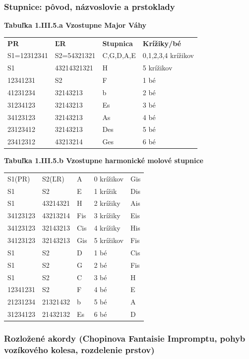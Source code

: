 \subsubsection{Stupnice: pôvod, názvoslovie a prstoklady}

\textbf{Tabuľka 1.III.5.a Vzostupne Major Váhy}\\
\noindent\begin{tabular}{L{1in}L{1in}L{1in}L{1in}}
\textbf{PR} & \textbf{ĽR} & \textbf{Stupnica} & \textbf{Krížiky/bé}\\
S1=12312341 & S2=54321321 & C,G,D,A,E & 0,1,2,3,4 krížikov\\
S1 & 43214321321 & H & 5 krížikov\\
12341231 & S2 & F & 1 bé\\
41231234 & 32143213 & b & 2 bé\\
31234123 & 32143213 & Es & 3 bé\\
34123123 & 32143213 & As & 4 bé\\
23123412 & 32143213 & Des & 5 bé\\
23412312 & 43213214 & Ges & 6 bé
\end{tabular}
\bigskip

\textbf{Tabuľka 1.III.5.b Vzostupne harmonické molové stupnice}\\
\begin{tabular}{L{1in}L{1in}L{1in}L{1in}L{1in}}
S1(PR) & S2(ĽR) & A & 0 krížikov & Gis\\
S1 & S2 & E & 1 krížik & Dis\\
S1 & 43214321 & H & 2 krížiky & Ais\\
34123123 & 43213214 & Fis & 3 krížiky & Eis\\
34123123 & 32143213 & Cis & 4 krížiky & His\\
34123123 & 32143213 & Gis & 5 krížikov & Fis\\
S1 & S2 & D & 1 bé & Cis\\
S1 & S2 & G & 2 bé & Fis\\
S1 & S2 & C & 3 bé & H\\
12341231 & S2 & F & 4 bé & E\\
21231234 & 21321432 & b & 5 bé & A\\
31234123 & 21432132 & Es & 6 bé & D
\end{tabular}

\subsubsection{Rozložené akordy (Chopinova Fantaisie Impromptu, pohyb vozíkového kolesa, rozdelenie prstov)}

